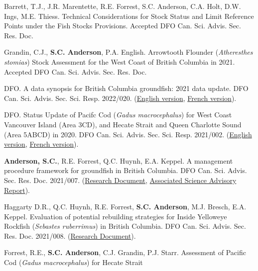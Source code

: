\begin{description}
\tightlist
\item[2023]
Barrett, T.J., J.R. Marentette, R.E. Forrest, S.C. Anderson, C.A. Holt,
D.W. Ings, M.E. Thiess. Technical Considerations for Stock Status and
Limit Reference Points under the Fish Stocks Provisions. Accepted DFO
Can. Sci. Advis. Sec. Res. Doc.
\item[2022]
Grandin, C.J., \textbf{S.C. Anderson}, P.A. English. Arrowtooth Flounder
(\emph{Atheresthes stomias}) Stock Assessment for the West Coast of
British Columbia in 2021. Accepted DFO Can. Sci. Advis. Sec. Res. Doc.
\item[2022]
DFO. A data synopsis for British Columbia groundfish: 2021 data update.
DFO Can. Sci. Advis. Sec. Sci. Resp. 2022/020.
(\href{https://www.dfo-mpo.gc.ca/csas-sccs/Publications/ScR-RS/2022/2022_020-eng.html}{English
version},
\href{https://www.dfo-mpo.gc.ca/csas-sccs/Publications/ScR-RS/2022/2022_020-fra.html}{French
version}).
\item[2021]
DFO. Status Update of Pacifc Cod (\emph{Gadus macrocephalus}) for West
Coast Vancouver Island (Area 3CD), and Hecate Strait and Queen Charlotte
Sound (Area 5ABCD) in 2020. DFO Can. Sci. Advis. Sec. Sci. Resp.
2021/002.
(\href{https://www.dfo-mpo.gc.ca/csas-sccs/Publications/ResDocs-DocRech/2021/2021_007-eng.html}{English
version},
\href{https://www.dfo-mpo.gc.ca/csas-sccs/Publications/ResDocs-DocRech/2021/2021_007-fra.html}{French
version}).
\item[2021]
\textbf{Anderson, S.C.}, R.E. Forrest, Q.C. Huynh, E.A. Keppel. A
management procedure framework for groundﬁsh in British Columbia. DFO
Can. Sci. Advis. Sec. Res. Doc. 2021/007.
(\href{https://www.dfo-mpo.gc.ca/csas-sccs/Publications/ResDocs-DocRech/2021/2021_007-eng.html}{Research
Document},
\href{https://www.dfo-mpo.gc.ca/csas-sccs/Publications/SAR-AS/2021/2021_002-eng.html}{Associated
Science Advisory Report}).
\item[2021]
Haggarty D.R., Q.C. Huynh, R.E. Forrest, \textbf{S.C. Anderson}, M.J.
Bresch, E.A. Keppel. Evaluation of potential rebuilding strategies for
Inside Yelloweye Rockfish (\emph{Sebastes ruberrimus}) in British
Columbia. DFO Can. Sci. Advis. Sec. Res. Doc. 2021/008.
(\href{https://www.dfo-mpo.gc.ca/csas-sccs/Publications/ResDocs-DocRech/2021/2021_008-eng.html}{Research
Document}).
\item[2020]
Forrest, R.E., \textbf{S.C. Anderson}, C.J. Grandin, P.J. Starr.
Assessment of Pacific Cod (\emph{Gadus macrocephalus}) for Hecate Strait

\end{description}
